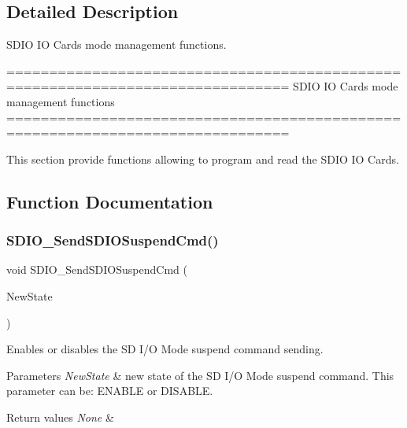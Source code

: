\subsection{Detailed Description}
S\+D\+IO IO Cards mode management functions. 

\begin{DoxyVerb} ===============================================================================
              SDIO IO Cards mode management functions
 ===============================================================================  

  This section provide functions allowing to program and read the SDIO IO Cards.\end{DoxyVerb}
 

\subsection{Function Documentation}
\mbox{\label{group__SDIO__Group4_ga9264137a01a1ab81d03bc80a3b3120fc}} 
\subsubsection{S\+D\+I\+O\+\_\+\+Send\+S\+D\+I\+O\+Suspend\+Cmd()}
{\footnotesize\ttfamily void S\+D\+I\+O\+\_\+\+Send\+S\+D\+I\+O\+Suspend\+Cmd (\begin{DoxyParamCaption}\item[{\textbf{ Functional\+State}}]{New\+State }\end{DoxyParamCaption})}



Enables or disables the SD I/O Mode suspend command sending. 


\begin{DoxyParams}{Parameters}
{\em New\+State} & new state of the SD I/O Mode suspend command. This parameter can be\+: E\+N\+A\+B\+LE or D\+I\+S\+A\+B\+LE. \\
\hline
\end{DoxyParams}

\begin{DoxyRetVals}{Return values}
{\em None} & \\
\hline
\end{DoxyRetVals}


